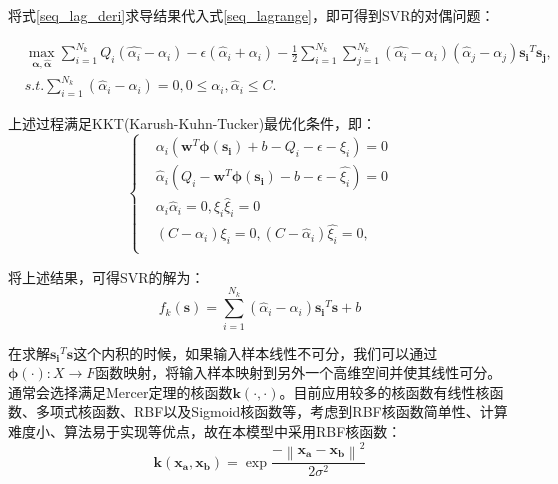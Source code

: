 将式\eqref{seq_lag_deri}求导结果代入式\eqref{seq_lagrange}，即可得到SVR的对偶问题：

\begin{equation}\label{seq_lagr_dual}
\begin{split}
&\max_{\bm{\alpha}, \bm{\hat{\alpha}}} \sum_{i=1}^{N_{k}} Q_{i}(\hat{\alpha_{i}} - \alpha_{i}) - \epsilon (\hat{\alpha}_{i} + \alpha_{i}) - \frac{1}{2} \sum_{i=1}^{N_{k}} \sum_{j=1}^{N_{k}}(\hat{\alpha_{i}}-\alpha_{i})(\hat{\alpha}_{j}-\alpha_{j})\bm{s_{i}}^{T}\bm{s_{j}},\\
&s.t. \sum_{i=1}^{N_{k}}(\hat{\alpha}_{i}-\alpha_{i})=0, 0 \leqslant \alpha_{i},\hat{\alpha}_{i} \leqslant C.
\end{split}
\end{equation}


上述过程满足KKT(Karush-Kuhn-Tucker)最优化条件，即：
\begin{equation}
\label{seq_kkt}
\left\{\begin{matrix}
&\alpha_{i}(\bm{w}^{T} \bm{\phi(s_{i})} + b - Q_{i} - \epsilon - \xi_{i})=0
\\ 
&\hat{\alpha}_{i}(Q_{i} - \bm{w}^{T} \bm{\phi(s_{i})} - b - \epsilon - \hat{\xi_{i}})=0
\\ 
&\alpha_{i}\hat{\alpha}_{i}=0, \xi_{i}\hat{\xi}_{i}=0
\\ 
&(C-\alpha_{i})\xi_{i}=0,(C-\hat{\alpha}_{i})\hat{\xi_{i}}=0,
\\
\end{matrix}\right.
\end{equation}

将上述结果，可得SVR的解为：
\begin{equation}
\label{seq_svr_final}
f_{k}(\bm{s})=\sum_{i=1}^{N_{k}}(\hat{\alpha}_{i}-\alpha_{i})\bm{s_{i}}^{T}\bm{s}+b
\end{equation}

在求解$\bm{s_{i}}^{T}\bm{s}$这个内积的时候，如果输入样本线性不可分，我们可以通过$\bm{\phi(\cdot)}:X \to F$函数映射，将输入样本映射到另外一个高维空间并使其线性可分。通常会选择满足Mercer定理的核函数$\bm{k(\cdot,\cdot)}$。目前应用较多的核函数有线性核函数、多项式核函数、RBF以及Sigmoid核函数等，考虑到RBF核函数简单性、计算难度小、算法易于实现等优点，故在本模型中采用RBF核函数：
\begin{equation}
\bm{k(x_{a},x_{b})}=\exp{\frac{-\left \| \bm{x_{a}} - \bm{x_{b}} \right \|^{2}}{2\sigma^{2}}}
\end{equation}

